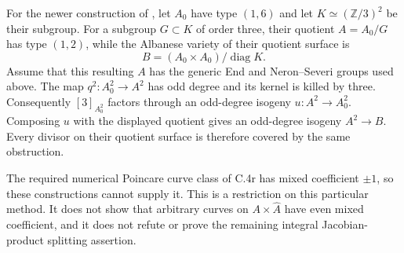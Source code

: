 For the newer construction of
\citet[Proposition 4.2, Theorem 5.6, Proposition 6.2, and
Corollary 6.3]{frC4GrossiMoretti2025}, let $A_0$ have type
$(1,6)$ and let $K\simeq(\mathbb Z/3)^2$ be their subgroup.
For a subgroup $G\subset K$ of order three, their quotient
$A=A_0/G$ has type $(1,2)$, while the Albanese variety of
their quotient surface is
\[
                  B=(A_0\times A_0)/\operatorname{diag}K.
\]
Assume that this resulting $A$ has the generic End and
Neron--Severi groups used above. The map
$q^2:A_0^2\to A^2$ has odd degree and its kernel is killed
by three. Consequently $[3]_{A_0^2}$ factors through an
odd-degree isogeny $u:A^2\to A_0^2$. Composing $u$ with
the displayed quotient gives an odd-degree isogeny
$A^2\to B$. Every divisor on their quotient surface is
therefore covered by the same obstruction.

The required numerical Poincare curve class of C.4r has
mixed coefficient $\pm1$, so these constructions cannot supply
it. This is a restriction on this particular method. It does
not show that arbitrary curves on $A\times\widehat A$ have
even mixed coefficient, and it does not refute or prove the
remaining integral Jacobian-product splitting assertion.
